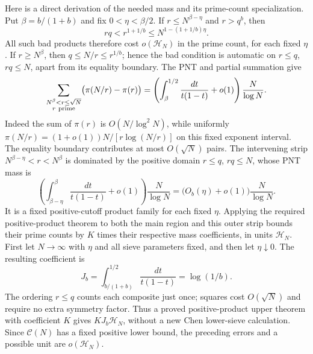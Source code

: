 Here is a direct derivation of the needed mass and its prime-count
specialization. Put $\beta=b/(1+b)$ and fix
$0<\eta<\beta/2$. If $r\le N^{\beta-\eta}$ and $r>q^b$, then
\[
 rq<r^{1+1/b}\le N^{1-(1+1/b)\eta}.
\]
All such bad products therefore cost $o(\mathcal H_N)$ in the prime
count, for each fixed $\eta$. If $r\ge N^\beta$, then
$q\le N/r\le r^{1/b}$; hence the bad condition is automatic on
$r\le q$, $rq\le N$, apart from its equality boundary. The PNT and
partial summation give
\[
 \sum_{\substack{N^\beta<r\le\sqrt N\\r\ {\rm prime}}}
       \bigl(\pi(N/r)-\pi(r)\bigr)
 =\left(\int_\beta^{1/2}\frac{dt}{t(1-t)}+o(1)\right)
      \frac{N}{\log N}.
\]
Indeed the sum of $\pi(r)$ is $O(N/\log^2N)$, while uniformly
$\pi(N/r)=(1+o(1))N/[r\log(N/r)]$ on this fixed exponent interval.
The equality boundary contributes at most $O(\sqrt N)$ pairs.
The intervening strip $N^{\beta-\eta}<r<N^\beta$ is dominated by the
positive domain $r\le q$, $rq\le N$, whose PNT mass is
\[
 \left(\int_{\beta-\eta}^{\beta}\frac{dt}{t(1-t)}+o(1)\right)
 \frac{N}{\log N}=\bigl(O_b(\eta)+o(1)\bigr)\frac{N}{\log N}.
\]
It is a fixed positive-cutoff product family for each fixed $\eta$.
Applying the required positive-product theorem to both the main
region and this outer strip bounds their prime counts by $K$ times
their respective mass coefficients, in units $\mathcal H_N$.
First let $N\to\infty$ with $\eta$ and all sieve parameters fixed,
and then let $\eta\downarrow0$. The resulting coefficient is
\[
 J_b=\int_{b/(1+b)}^{1/2}\frac{dt}{t(1-t)}=\log(1/b).
\]
The ordering $r\le q$ counts each composite just once; squares cost
$O(\sqrt N)$ and require no extra symmetry factor. Thus a proved
positive-product upper theorem with coefficient $K$ gives
$KJ_b\mathcal H_N$, without a new Chen lower-sieve calculation.
Since $\mathcal C(N)$ has a fixed positive
lower bound, the preceding errors and a possible unit are
$o(\mathcal H_N)$.


